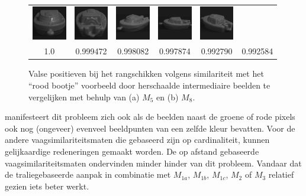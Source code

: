 \begin{figure}[!bp]
{\begin{minipage}{\textwidth}
\begin{tabular}{cccccc}
\includegraphics[width=1.5cm]{coil/beeld-26.eps} &
\includegraphics[width=1.5cm]{coil/beeld-29.eps} &
\includegraphics[width=1.5cm]{coil/beeld-27.eps} &
\includegraphics[width=1.5cm]{coil/beeld-24.eps} &
\includegraphics[width=1.5cm]{coil/beeld-28.eps} \\
{\scriptsize 1.0} & 
{\scriptsize 0.999472} & 
{\scriptsize 0.998082} & 
{\scriptsize 0.997874} & 
{\scriptsize 0.992790} &
{\scriptsize 0.992584} 
\end{tabular}
\end{minipage}
\label{fig:valse_positieven_M8}
}
\caption{\label{fig:valse_positieven}Valse positieven bij het rangschikken volgens similariteit met 
het ``rood bootje'' voorbeeld door herschaalde intermediaire beelden te vergelijken met behulp van 
(a) $M_5$ en (b) $M_8$.}
\end{figure}
manifesteert dit probleem zich ook als de 
beelden naast de groene of rode pixels ook nog (ongeveer) evenveel beeldpunten van een zelfde kleur bevatten. 
Voor de andere vaagsimilariteitsmaten die gebaseerd zijn op cardinaliteit, kunnen gelijkaardige redeneringen 
gemaakt worden. De op afstand gebaseerde vaagsimilariteitsmaten ondervinden minder hinder van dit probleem. 
Vandaar dat de traliegebaseerde aanpak in combinatie met
$M_{1a}$, $M_{1b}$, $M_{1c}$, $M_{2}$ of $M_{3}$ relatief gezien iets beter werkt.

